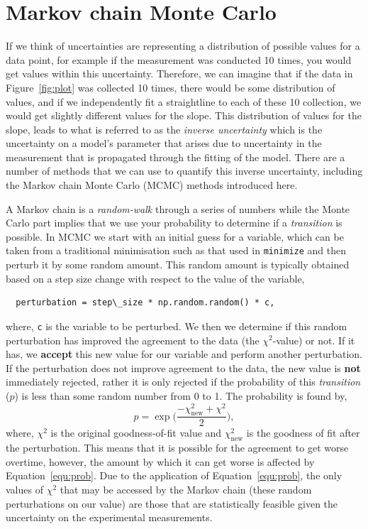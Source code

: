 \documentclass[a4paper]{article}
\begin{document}
\section{Markov chain Monte Carlo}
If we think of uncertainties are representing a distribution of possible values for a data point, for example if the measurement was conducted 10 times, you would get values within this uncertainty. 
Therefore, we can imagine that if the data in Figure~\ref{fig:plot} was collected 10 times, there would be some distribution of values, and if we independently fit a straightline to each of these 10 collection, we would get slightly different values for the slope. 
This distribution of values for the slope, leads to what is referred to as the \emph{inverse uncertainty} which is the uncertainty on a model's parameter that arises due to uncertainty in the measurement that is propagated through the fitting of the model. 
There are a number of methods that we can use to quantify this inverse uncertainty, including the Markov chain Monte Carlo (MCMC) methods introduced here. 

A Markov chain is a \emph{random-walk} through a series of numbers while the Monte Carlo part implies that we use your probability to determine if a \emph{transition} is possible.
In MCMC we start with an initial guess for a variable, which can be taken from a traditional minimisation such as that used in \texttt{minimize} and then perturb it by some random amount. 
This random amount is typically obtained based on a step size change with respect to the value of the variable, 
%
\begin{lstlisting}
  perturbation = step\_size * np.random.random() * c,
\end{lstlisting}
%
where, \texttt{c} is the variable to be perturbed.
We then we determine if this random perturbation has improved the agreement to the data (the $\chi^2$-value) or not. 
If it has, we \textbf{accept} this new value for our variable and perform another perturbation. 
If the perturbation does not improve agreement to the data, the new value is \textbf{not} immediately rejected, rather it is only rejected if the probability of this \emph{transition} ($p$) is less than some random number from 0 to 1. 
The probability is found by, 
%
\begin{equation}
  p = \exp{\bigg(\frac{-\chi^2_{\text{new}} + \chi^2}{2}\bigg)},
  \label{equ:prob}
\end{equation}
%
where, $\chi^2$ is the original goodness-of-fit value and $\chi^2_{\text{new}}$ is the goodness of fit after the perturbation. 
This means that it is possible for the agreement to get worse overtime, however, the amount by which it can get worse is affected by Equation~\ref{equ:prob}. 
Due to the application of Equation~\ref{equ:prob}, the only values of $\chi^2$ that may be accessed by the Markov chain (these random perturbations on our value) are those that are statistically feasible given the uncertainty on the experimental measurements. 
\end{document}

